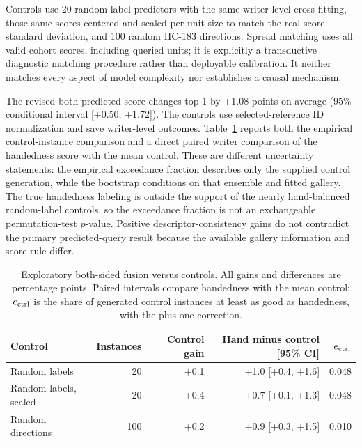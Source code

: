 \documentclass[10pt,a4paper]{article}
\begin{document}
Controls use 20 random-label predictors with the same writer-level cross-fitting, those same scores centered and scaled per unit size to match the real score standard deviation, and 100 random HC-183 directions. Spread matching uses all valid cohort scores, including queried units; it is explicitly a transductive diagnostic matching procedure rather than deployable calibration. It neither matches every aspect of model complexity nor establishes a causal mechanism.

The revised both-predicted score changes top-1 by +1.08 points on average (95\% conditional interval [+0.50, +1.72]). The controls use selected-reference ID normalization and save writer-level outcomes. Table~\ref{tab:both} reports both the empirical control-instance comparison and a direct paired writer comparison of the handedness score with the mean control. These are different uncertainty statements: the empirical exceedance fraction describes only the supplied control generation, while the bootstrap conditions on that ensemble and fitted gallery. The true handedness labeling is outside the support of the nearly hand-balanced random-label controls, so the exceedance fraction is not an exchangeable permutation-test $p$-value. Positive descriptor-consistency gains do not contradict the primary predicted-query result because the available gallery information and score rule differ.

\begin{table}[ht]
\centering\small
\caption{Exploratory both-sided fusion versus controls. All gains and differences are percentage points. Paired intervals compare handedness with the mean control; $e_{\rm ctrl}$ is the share of generated control instances at least as good as handedness, with the plus-one correction.}\label{tab:both}
\begin{tabular}{lrrrr}\toprule
Control & Instances & Control gain & Hand minus control [95\% CI] & $e_{\rm ctrl}$\\\midrule
Random labels & 20 & +0.1 & +1.0 [+0.4, +1.6] & 0.048 \\
Random labels, scaled & 20 & +0.4 & +0.7 [+0.1, +1.3] & 0.048 \\
Random directions & 100 & +0.2 & +0.9 [+0.3, +1.5] & 0.010 \\
\bottomrule

\end{tabular}
\end{table}
\end{document}
